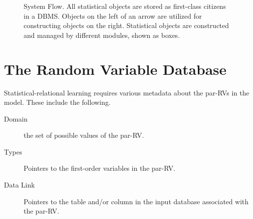 \documentclass{sfuthesis}
\begin{document}
%
\begin{figure}[t]
\begin{center}
\caption{System Flow. All statistical objects are stored as first-class citizens in a DBMS. Objects on the left of an arrow are utilized for constructing objects on the right. Statistical objects are constructed and managed by different modules, shown as boxes. 
\label{fig:architecture}}
\end{center}
\end{figure}


\section{The Random Variable Database} \label{chaSecRVD}

Statistical-relational learning requires various metadata about the par-RVs in the model. These include the following. 

\begin{description}
\item[Domain] the set of possible values of the par-RV.
\item[Types] Pointers to the first-order variables in the par-RV. 
\item[Data Link] Pointers to the table and/or column in the input database associated with the par-RV. 
\end{description}
\end{document}
